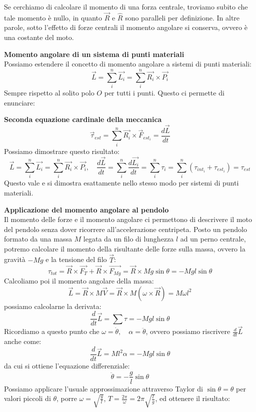 \documentclass[a4paper,12pt]{article}
\begin{document}
Se cerchiamo di calcolare il momento di una forza centrale, troviamo subito che tale momento è nullo, in quanto $\vec{R}$
e $\hat{R}$ sono paralleli per definizione. In altre parole, sotto l'effetto di forze centrali il momento angolare si conserva,
ovvero è una costante del moto.
\par\smallskip
\textbf{Momento angolare di un sistema di punti materiali} \\
Possiamo estendere il concetto di momento angolare a sistemi di punti materiali:
$$ \vec{L} = \sum_i^n \vec{L_i} = \sum_i^n \vec{R_i} \times \vec{P_i} $$
Sempre rispetto al solito polo $O$ per tutti i punti. Questo ci permette di enunciare:
\par\smallskip
\textbf{Seconda equazione cardinale della meccanica} \\
$$ \vec{\tau}_{est} = \sum_i^n \vec{R_i} \times \vec{F}_{est_i} = \frac{d\vec{L}}{dt} $$
Possiamo dimostrare questo risultato:
$$ \vec{L} = \sum_i^n \vec{L_i} = \sum_i^n \vec{R_i} \times \vec{P_i}, \quad \frac{d\vec{L}}{dt} = \sum_i^n \frac{d\vec{L_i}}{dt} = \sum_i^n \tau_i = \sum_i^n (\tau_{int_i} + \tau_{est_i}) = \tau_{est} $$
Questo vale e si dimostra esattamente nello stesso modo per sistemi di punti materiali.
\par\smallskip
\textbf{Applicazione del momento angolare al pendolo} \\
Il momento delle forze e il momento angolare ci permettono di descrivere il moto del pendolo senza dover ricorrere
all'accelerazione centripeta. Posto un pendolo formato da una massa $M$ legata da un filo di lunghezza $l$ ad un perno
centrale, potremo calcolare il momento della risultante delle forze sulla massa, ovvero la gravità $-Mg$ e la tensione
del filo $\vec{T}$:
$$ \tau_{tot} = \vec{R} \times \vec{F_T} + \vec{R} \times \vec{F_{Mg}} = \vec{R} \times Mg\sin{\theta} = -Mgl\sin{\theta} $$
Calcoliamo poi il momento angolare della massa:
$$ \vec{L} = \vec{R} \times M\vec{V} = \vec{R} \times M(\omega \times \vec{R}) = M\omega l^2 $$
possiamo calcolarne la derivata:
$$ \frac{d}{dt}\vec{L} = \sum \tau = -Mgl\sin{\theta} $$
Ricordiamo a questo punto che $\omega = \dot{\theta}, \quad \alpha = \ddot{\theta}$, ovvero possiamo riscrivere
$\frac{d}{dt}\vec{L}$ anche come:
$$\frac{d}{dt} \vec{L} = Ml^2\alpha = -Mgl\sin{\theta} $$
da cui si ottiene l'equazione differenziale:
$$ \ddot{\theta} = -\frac{g}{l}\sin{\theta} $$
Possiamo applicare l'usuale approssimazione attraverso Taylor di $\sin{\theta} = \theta$ per valori piccoli di $\theta$,
porre $\omega = \sqrt{\frac{g}{l}}$, $T=\frac{2\pi}{\omega} = 2\pi\sqrt{\frac{l}{g}}$, ed ottenere il risultato:
\end{document}
